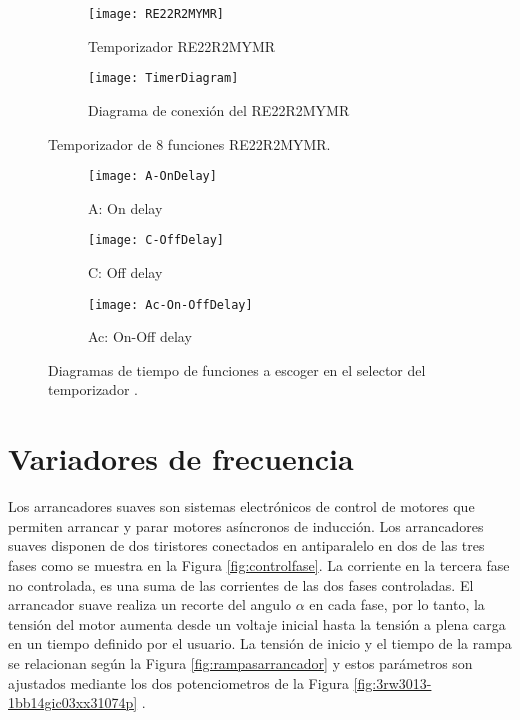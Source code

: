 \begin{figure}
	\centering
	\begin{subfigure}[b]{0.3\textwidth}
		\centering
		\texttt{[image: RE22R2MYMR]}
		\caption{Temporizador RE22R2MYMR \cite{Scheneider3} }
		\label{fig:imagen}
	\end{subfigure}
	\hfill
	\begin{subfigure}[b]{0.5\textwidth}
		\centering
		\texttt{[image: TimerDiagram]}
		\caption{Diagrama de conexión del RE22R2MYMR \cite{Scheneider4} }
		\label{fig:Diagrama}
	\end{subfigure}
	\caption{Temporizador de 8 funciones RE22R2MYMR.}
\end{figure}



\begin{figure}
	\centering
	\begin{subfigure}[b]{0.32\textwidth}
		\centering
		\texttt{[image: A-OnDelay]}
		\caption{A: On delay }
		\label{fig:on-delay}
	\end{subfigure}
	\begin{subfigure}[b]{0.32\textwidth}
		\centering
		\texttt{[image: C-OffDelay]}
		\caption{C: Off delay}
		\label{fig:Off-delay}
	\end{subfigure}
	\begin{subfigure}[b]{0.32\textwidth}
	\centering
	\texttt{[image: Ac-On-OffDelay]}
	\caption{Ac: On-Off delay }
	\label{fig:OnOff-delay}
	\end{subfigure}
	\caption{Diagramas de tiempo de funciones a escoger en el selector del temporizador \cite{Scheneider4}.}
	\label{fig:Funciones}
\end{figure}

\section{Variadores de frecuencia}


Los arrancadores suaves son sistemas electrónicos de control de motores que permiten arrancar y parar motores asíncronos de inducción. Los arrancadores suaves disponen de dos tiristores conectados en antiparalelo en dos de las tres fases como se muestra en la Figura \ref{fig:controlfase}. La corriente en la tercera fase no controlada, es una suma de las corrientes de las dos fases controladas. El arrancador suave realiza un recorte del angulo $\alpha$ en cada fase, por lo tanto, la tensión del motor aumenta desde un voltaje inicial hasta la tensión a plena carga en un tiempo definido por el usuario. La tensión de inicio y el tiempo de la rampa se relacionan según la Figura \ref{fig:rampasarrancador} y estos parámetros son ajustados mediante los dos potenciometros de la Figura \ref{fig:3rw3013-1bb14gic03xx31074p} .

